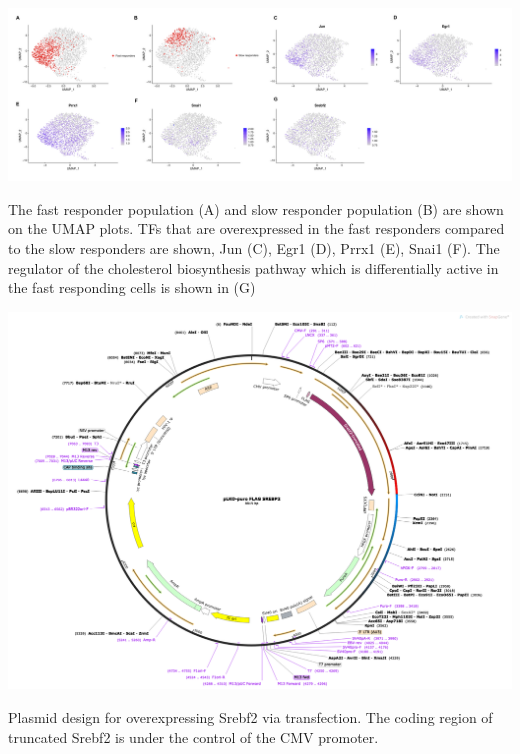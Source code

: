 \begin{suppfigure}[p]  
    \centering
    \includegraphics[width=\linewidth]{figures/hedgehog/SuppFigure10.png}
    \caption[TF expression on UMAP]{
        The fast responder population (A) and slow responder population (B) are shown on the UMAP plots. TFs that are overexpressed in the fast responders compared to the slow responders are shown, Jun (C), Egr1 (D), Prrx1 (E),  Snai1 (F). The regulator of the cholesterol biosynthesis pathway which is differentially active in the fast responding cells is shown in (G)  
    }
    \label{fig:hh_figureS10}
\end{suppfigure}


\begin{suppfigure}[p]  
    \centering
    \includegraphics[width=\linewidth]{figures/hedgehog/SuppFigure11.png}
    \caption[Plasmid design for Srebf2 transfection]{
        Plasmid design for overexpressing Srebf2 via transfection. The coding region of truncated Srebf2 is under the control of the CMV promoter.
    }
    \label{fig:hh_figureS11}
\end{suppfigure}


